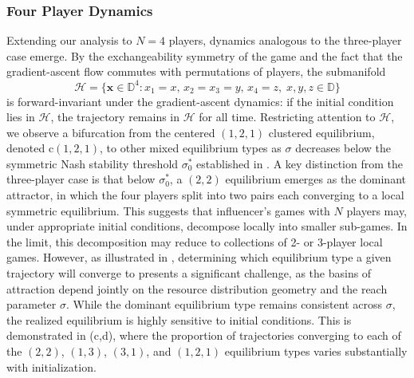 \documentclass{article}
\begin{document}
                \clearpage
                \subsubsection{Four Player Dynamics}
                    Extending our analysis to $N = 4$ players, dynamics analogous to the three-player case emerge. By the exchangeability symmetry of the game and the fact that the gradient-ascent flow commutes with permutations of players, the submanifold
                    \begin{equation}
                        \mathcal{H} = \{\mathbf{x} \in \mathbb{D}^4 : x_1 = x,\, x_2 = x_3 = y,\, 
                        x_4 = z,\; x,y,z \in \mathbb{D}\}
                    \end{equation}
                    is forward-invariant under the gradient-ascent dynamics: if the initial condition lies in $\mathcal{H}$, the trajectory remains in $\mathcal{H}$ for all time. Restricting attention to $\mathcal{H}$, we observe a bifurcation from the centered $(1,2,1)$ clustered equilibrium, denoted $\mathrm{c}(1,2,1)$, to other mixed equilibrium types as $\sigma$ decreases below the symmetric Nash stability threshold $\sigma_0^*$ established in . A key distinction from the three-player case is that below $\sigma_0^*$, a $(2,2)$ equilibrium emerges as the dominant attractor, in which the four players split into two pairs each converging to a local symmetric equilibrium. This suggests that influencer's games with $N$ players may, under appropriate initial conditions, decompose locally into smaller sub-games. In the limit, this decomposition may reduce to collections of 2- or 3-player local games. However, as illustrated in , determining which equilibrium type a given trajectory will converge to presents a significant challenge, as the basins of attraction depend jointly on the resource distribution geometry and the reach parameter $\sigma$. While the dominant equilibrium type remains consistent across $\sigma$, the realized equilibrium is highly sensitive to initial conditions. This is demonstrated in  (c,d), where the proportion of trajectories converging to each of the $(2,2)$, $(1,3)$, $(3,1)$, and $(1,2,1)$ equilibrium types varies substantially with initialization.
\end{document}
